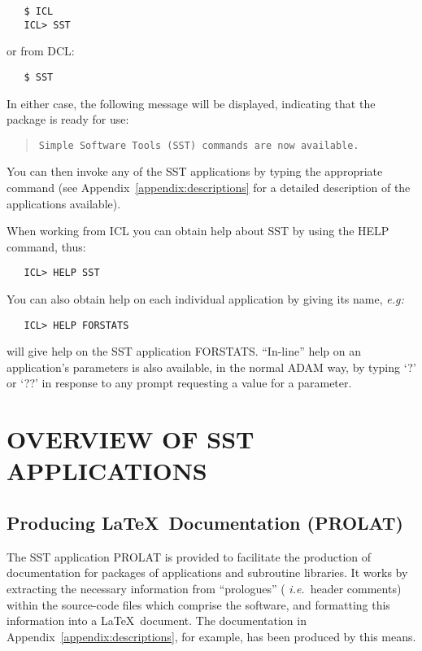 \begin{verbatim}
   $ ICL
   ICL> SST
\end{verbatim}

or from DCL:

\begin{verbatim}
   $ SST
\end{verbatim}

In either case, the following message will be displayed, indicating that the
package is ready for use:

\begin{quote}
{\tt Simple Software Tools (SST) commands are now available.}
\end{quote}

You can then invoke any of the SST applications by typing the appropriate
command (see Appendix~\ref{appendix:descriptions} for a detailed description
of the applications available).

When working from ICL you can obtain help about SST by using the HELP command,
thus:

\begin{verbatim}
   ICL> HELP SST
\end{verbatim}

You can also obtain help on each individual application by giving its name,
{\em e.g:}

\begin{verbatim}
   ICL> HELP FORSTATS
\end{verbatim}

will give help on the SST application FORSTATS.
``In-line'' help on an application's parameters is also available, in the
normal ADAM way, by typing `?' or `??' in response to any prompt requesting a
value for a parameter.


\section{OVERVIEW OF SST APPLICATIONS}

\subsection{Producing \LaTeX\ Documentation (PROLAT)}

The SST application PROLAT is provided to facilitate the production of
documentation for packages of applications and subroutine libraries.
It works by extracting the necessary information from ``prologues'' ({\em
i.e.}\ header comments) within the source-code files which comprise the
software, and formatting this information into a \LaTeX\ document.
The documentation in Appendix~\ref{appendix:descriptions}, for example, has
been produced by this means.

